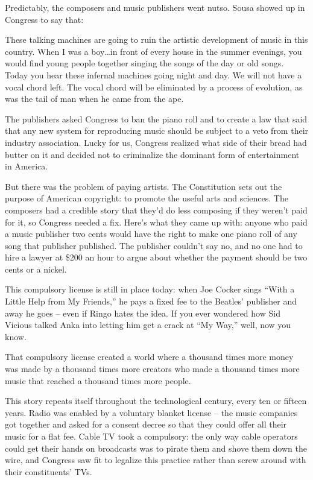 Predictably, the composers and music publishers went nutso. Sousa
showed up in Congress to say that:

These talking machines are going to ruin the artistic development
of music in this country. When I was a boy\ldots in front of every
house in the summer evenings, you would find young people together
singing the songs of the day or old songs. Today you hear these
infernal machines going night and day. We will not have a vocal
chord left. The vocal chord will be eliminated by a process of
evolution, as was the tail of man when he came from the ape.

The publishers asked Congress to ban the piano roll and to create a
law that said that any new system for reproducing music should be
subject to a veto from their industry association. Lucky for us,
Congress realized what side of their bread had butter on it and
decided not to criminalize the dominant form of entertainment in
America.

But there was the problem of paying artists. The Constitution sets
out the purpose of American copyright: to promote the useful arts
and sciences. The composers had a credible story that they'd do
less composing if they weren't paid for it, so Congress needed a
fix. Here's what they came up with: anyone who paid a music
publisher two cents would have the right to make one piano roll of
any song that publisher published. The publisher couldn't say no,
and no one had to hire a lawyer at \$200 an hour to argue about
whether the payment should be two cents or a nickel.

This compulsory license is still in place today: when Joe Cocker
sings ``With a Little Help from My Friends,'' he pays a fixed fee to
the Beatles' publisher and away he goes -- even if Ringo hates the
idea. If you ever wondered how Sid Vicious talked Anka into letting
him get a crack at ``My Way,'' well, now you know.

That compulsory license created a world where a thousand times more
money was made by a thousand times more creators who made a
thousand times more music that reached a thousand times more
people.

This story repeats itself throughout the technological century,
every ten or fifteen years. Radio was enabled by a voluntary
blanket license -- the music companies got together and asked for a
consent decree so that they could offer all their music for a flat
fee. Cable TV took a compulsory: the only way cable operators could
get their hands on broadcasts was to pirate them and shove them
down the wire, and Congress saw fit to legalize this practice
rather than screw around with their constituents' TVs.

